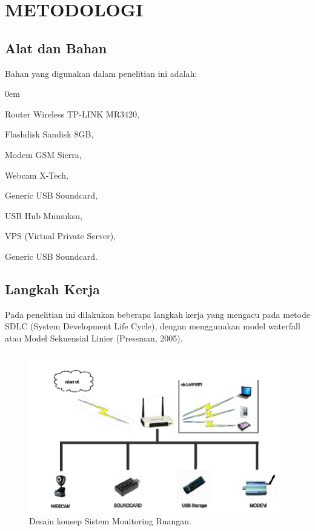 \documentclass{jtetiproposalskripsi}
\begin{document}
\chapter{METODOLOGI}

\section{Alat dan Bahan}
Bahan yang digunakan dalam penelitian ini adalah:

\vspace{-0.5cm}

\begin{enumerate}[1.]
\begin{singlespace}
\itemsep0em
\item Router Wireless TP-LINK MR3420,
\item Flashdisk Sandisk 8GB,
\item Modem GSM Sierra,
\item Webcam X-Tech,
\item Generic USB Soundcard,
\item USB Hub Mumuksu,
\item VPS (Virtual Private Server),
\item Generic USB Soundcard.
\end{singlespace}
\end{enumerate}

\section{Langkah Kerja}
Pada penelitian ini dilakukan beberapa langkah kerja yang mengacu pada metode SDLC (System Development Life Cycle), dengan menggunakan model waterfall atau Model Sekuensial Linier (Pressman, 2005).


\begin{figure}[ht!]
  \centering
    \includegraphics{gambar/konsep}
    \caption{Desain konsep Sistem Monitoring Ruangan.}
    \label{konsep}
\end{figure}
\end{document}
